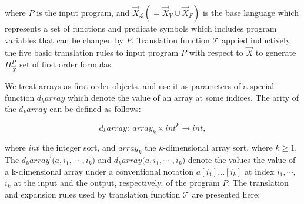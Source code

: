 \documentclass{article}
\begin{document}
where $P$ is the input program, and $\vec{X}_{\mathcal{L}}(=\vec{X}_{V}\cup\vec{X}_{F})$ is the base language which represents a set of functions and predicate symbols which  includes program variables that can be changed by $P$. Translation function $\mathcal{T}$  applied inductively the five basic translation rules to input program $P$ with respect to $\vec{X}$ to generate $\Pi^{P}_{\vec{X}}$ set of first order formulas. 


We treat arrays as first-order objects. and use it as parameters of a special function $d_{k}array$ which denote the value of an array at some indices. The arity of the $d_{k}array$ can be defined as follows:

\[
d_{k}array:\ array_k\times int^k\rightarrow int,
\]

where $int$ the integer sort, and $array_k$ the $k$-dimensional array sort, where $k\geq 1$. The $d_{k}array^{\prime}(a,i_1,\cdots$ $,i_k)$ and $d_{k}array(a,i_1,\cdots$ $,i_k)$ denote the values the value of a k-dimensional array under a conventional notation $a[i_1]...[i_k]$ at index $i_1,\cdots,$ $i_k$ at the input and the output, respectively, of the program $P$. The translation and expansion rules used by translation function $\mathcal{T}$ are presented here:






\end{document}
